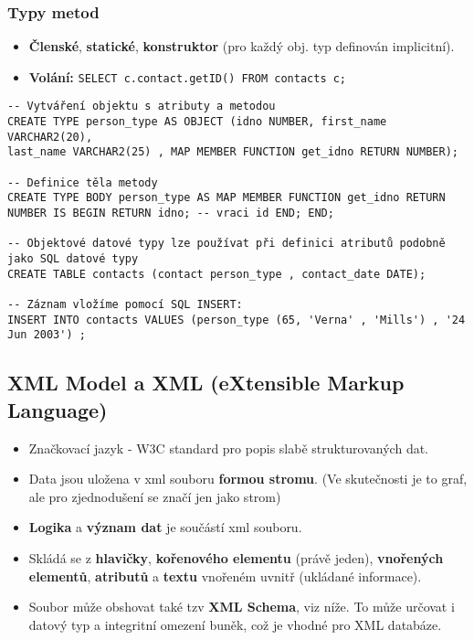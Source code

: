 \subsubsection{Typy metod}
\begin{itemize}
	\item \textbf{Členské}, \textbf{statické}, \textbf{konstruktor} (pro každý obj. typ definován implicitní).
	\item \textbf{Volání:} \texttt{SELECT c.contact.getID() FROM contacts c;}
\end{itemize}

\begin{verbatim}
-- Vytváření objektu s atributy a metodou
CREATE TYPE person_type AS OBJECT (idno NUMBER, first_name VARCHAR2(20), 
last_name VARCHAR2(25) , MAP MEMBER FUNCTION get_idno RETURN NUMBER);

-- Definice těla metody
CREATE TYPE BODY person_type AS MAP MEMBER FUNCTION get_idno RETURN 
NUMBER IS BEGIN RETURN idno; -- vraci id END; END;

-- Objektové datové typy lze používat při definici atributů podobně jako SQL datové typy
CREATE TABLE contacts (contact person_type , contact_date DATE);

-- Záznam vložíme pomocí SQL INSERT:
INSERT INTO contacts VALUES (person_type (65, 'Verna' , 'Mills') , '24 Jun 2003') ;
\end{verbatim}

\subsection{XML Model a XML (eXtensible Markup Language)}
\begin{itemize}
	\item Značkovací jazyk - W3C standard pro popis slabě strukturovaných dat.
	\item Data jsou uložena v xml souboru \textbf{formou stromu}. (Ve skutečnosti je to graf, ale pro zjednodušení se značí jen jako strom)
	\item \textbf{Logika} a \textbf{význam dat} je součástí xml souboru.
	\item Skládá se z \textbf{hlavičky}, \textbf{kořenového elementu} (právě jeden), \textbf{vnořených elementů}, \textbf{atributů} a \textbf{textu} vnořeném uvnitř (ukládané informace).
	\item Soubor může obshovat také tzv \textbf{XML Schema}, viz níže. To může určovat i datový typ a integritní omezení buněk, což je vhodné pro XML databáze.
\end{itemize}

